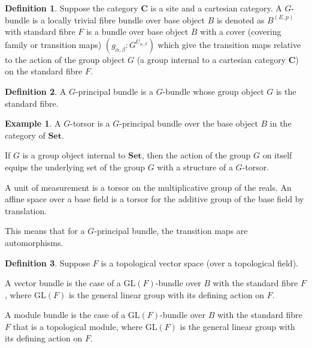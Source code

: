 \documentclass[10pt]{article}
\theoremstyle{plain}%
\theoremstyle{definition}
\newtheorem{definition}{Definition}[section]
\newtheorem{example}{Example}[section]
\theoremstyle{remark}
\begin{document}
\begin{definition}
	Suppose the category $\mathbf{C}$ is a site and a cartesian category.
	A $G$-bundle is a locally trivial fibre bundle over base object $B$ is denoted as $B^{(E, p)}$ with standard fibre $F$ is a bundle over base object $B$ with a cover (covering family or transition maps) $(g_{\alpha, \beta} : G^{U_{\alpha, \beta}})$ which give the transition maps relative to the action of the group object $G$ (a group internal to a cartesian category $\mathbf{C}$) on the standard fibre $F$.
\end{definition}

\begin{definition}
	A $G$-principal bundle is a $G$-bundle whose group object $G$ is the standard fibre.
\end{definition}

\begin{example}
	A $G$-torsor is a $G$-principal bundle over the base object $B$ in the category of $\mathbf{Set}$.

	If $G$ is a group object internal to $\mathbf{Set}$, then the action of the group $G$ on itself equips the underlying set of the group $G$ with a structure of a $G$-torsor.

	A unit of measurement is a torsor on the multiplicative group of the reals. An affine space over a base field is a torsor for the additive group of the base field by translation.
\end{example}

This means that for a $G$-principal bundle, the transition maps are automorphisms.

\begin{definition}
	Suppose $F$ is a topological vector space (over a topological field).
	
	A vector bundle is the case of a $\mathrm{GL}(F)$-bundle over $B$ with the standard fibre $F$, where $\mathrm{GL}(F)$ is the general linear group with its defining action on $F$.

	A module bundle is the case of a $\mathrm{GL}(F)$-bundle over $B$ with the standard fibre $F$ that is a topological module, where $\mathrm{GL}(F)$ is the general linear group with its defining action on $F$.
\end{definition}
\end{document}
